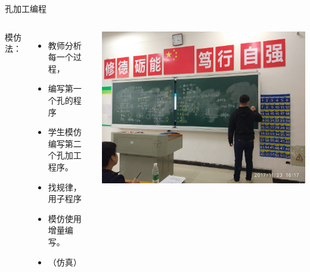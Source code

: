\documentclass[utf8,zihao=-4,handout,smaller,aspectratio=1610]{ctexbeamer}
\begin{document}
\begin{frame}{孔加工编程}
	\begin{columns}
		
		模仿法：
		
\begin{itemize}
	\item 	教师分析每一个过程，
	
	\item 编写第一个孔的程序
	
	\item 学生模仿编写第二个孔加工程序。
	
	\item 找规律，用子程序
	
	\item 模仿使用增量编写。
	
	\item （仿真）
\end{itemize}
	
		\includegraphics[width=\linewidth,trim=0 0 0  0,clip,angle=0]{image/31.jpg}~
	\end{columns}

\end{frame}
\end{document}
